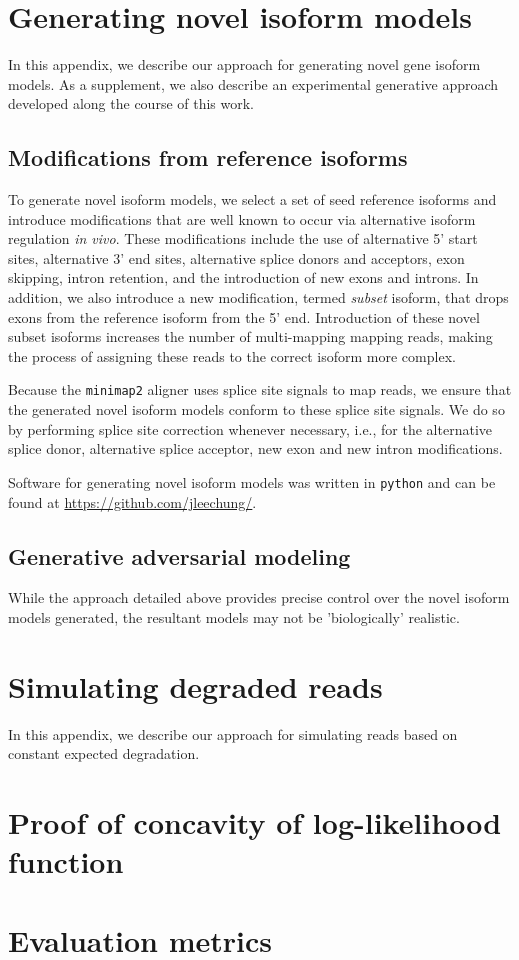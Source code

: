 
\chapter{Generating novel isoform models}

In this appendix, we describe our approach for generating novel gene isoform models. As a supplement, we also describe an experimental generative approach developed along the course of this work.   

\section{Modifications from reference isoforms}

To generate novel isoform models, we select a set of seed reference isoforms and introduce modifications that are well known to occur via alternative isoform regulation \textit{in vivo}. These modifications include the use of alternative 5' start sites, alternative 3' end sites, alternative splice donors and acceptors, exon skipping, intron retention, and the introduction of new exons and introns. In addition, we also introduce a new modification, termed \textit{subset} isoform, that drops exons from the reference isoform from the 5' end. Introduction of these novel subset isoforms increases the number of multi-mapping mapping reads, making the process of assigning these reads to the correct isoform more complex. 


Because the \texttt{minimap2} aligner uses splice site signals to map reads, we ensure that the generated novel isoform models conform to these splice site signals. We do so by performing splice site correction whenever necessary, i.e., for the alternative splice donor, alternative splice acceptor, new exon and new intron modifications. 


Software for generating novel isoform models was written in \texttt{python} and can be found at \url{https://github.com/jleechung/}.

\section{Generative adversarial modeling}

While the approach detailed above provides precise control over the novel isoform models generated, the resultant models may not be 'biologically' realistic.  

\chapter{Simulating degraded reads}

In this appendix, we describe our approach for simulating reads based on constant expected degradation.

\chapter{Proof of concavity of log-likelihood function}

\lipsum[77]

\chapter{Evaluation metrics}

\lipsum[32]